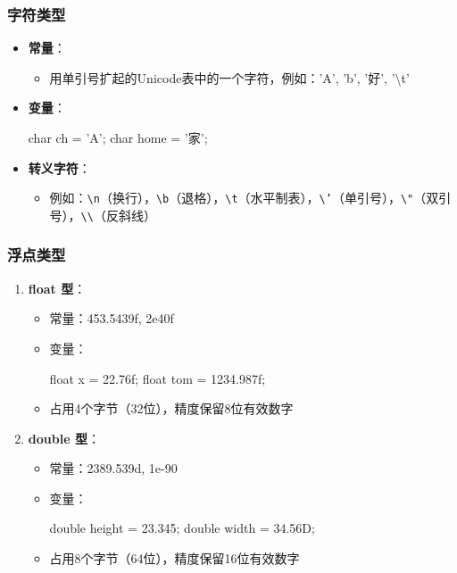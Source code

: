 \documentclass[a4paper, 10pt]{ctexart}
\begin{document}
\subsubsection{字符类型}
\begin{itemize}
  \item \textbf{常量}：
  \begin{itemize}
    \item 用单引号扩起的Unicode表中的一个字符，例如：'A', 'b', '好', '\textbackslash t'
  \end{itemize}
  \item \textbf{变量}：
  \begin{codeblock}
char ch = 'A';
char home = '家';
  \end{codeblock}
  \item \textbf{转义字符}：
  \begin{itemize}
    \item 例如：\texttt{\textbackslash n}（换行），\texttt{\textbackslash b}（退格），\texttt{\textbackslash t}（水平制表），\texttt{\textbackslash '}（单引号），\texttt{\textbackslash "}（双引号），\texttt{\textbackslash \textbackslash}（反斜线）
  \end{itemize}
\end{itemize}

\subsubsection{浮点类型}
\begin{enumerate}
  \item \textbf{float 型}：
  \begin{itemize}
    \item 常量：453.5439f, 2e40f
    \item 变量：
    \begin{codeblock}
float x = 22.76f;
float tom = 1234.987f;
    \end{codeblock}
    \item 占用4个字节（32位），精度保留8位有效数字
  \end{itemize}
  \item \textbf{double 型}：
  \begin{itemize}
    \item 常量：2389.539d, 1e-90
    \item 变量：
    \begin{codeblock}
double height = 23.345;
double width = 34.56D;
    \end{codeblock}
    \item 占用8个字节（64位），精度保留16位有效数字
  \end{itemize}
\end{enumerate}
\end{document}
